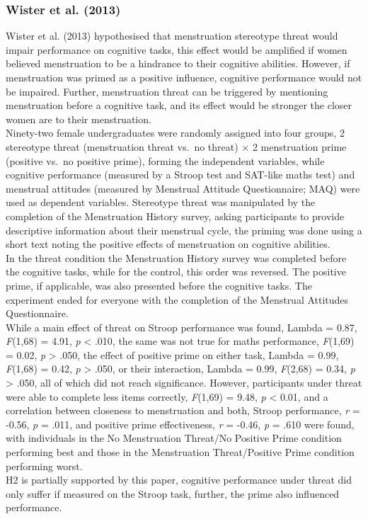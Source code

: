 \documentclass[
  stu,floatsintext]{apa7}
\begin{document}
\subsubsection{Wister et al. (2013)}\label{wistermentioningmenstruationstereotype2013}

Wister et al. (2013) hypothesised that menstruation stereotype threat would impair performance on cognitive tasks, this effect would be amplified if women believed menstruation to be a hindrance to their cognitive abilities.
However, if menstruation was primed as a positive influence, cognitive performance would not be impaired.
Further, menstruation threat can be triggered by mentioning menstruation before a cognitive task, and its effect would be stronger the closer women are to their menstruation.\\
Ninety-two female undergraduates were randomly assigned into four groups, 2 stereotype threat (menstruation threat vs.~no threat) \(\times\) 2 menstruation prime (positive vs.~no positive prime), forming the independent variables, while cognitive performance (measured by a Stroop test and SAT-like maths test) and menstrual attitudes (measured by Menstrual Attitude Questionnaire; MAQ) were used as dependent variables.
Stereotype threat was manipulated by the completion of the Menstruation History survey, asking participants to provide descriptive information about their menstrual cycle, the priming was done using a short text noting the positive effects of menstruation on cognitive abilities.\\
In the threat condition the Menstruation History survey was completed before the cognitive tasks, while for the control, this order was reversed.
The positive prime, if applicable, was also presented before the cognitive tasks.
The experiment ended for everyone with the completion of the Menstrual Attitudes Questionnaire.\\
While a main effect of threat on Stroop performance was found, Lambda = 0.87, \emph{F}(1,68) = 4.91, \emph{p} \textless{} .010, the same was not true for maths performance, \emph{F}(1,69) = 0.02, \emph{p} \textgreater{} .050, the effect of positive prime on either task, Lambda = 0.99, \emph{F}(1,68) = 0.42, \emph{p} \textgreater{} .050, or their interaction, Lambda = 0.99, \emph{F}(2,68) = 0.34, \emph{p} \textgreater{} .050, all of which did not reach significance.
However, participants under threat were able to complete less items correctly, \emph{F}(1,69) = 9.48, \emph{p} \textless{} 0.01, and a correlation between closeness to menstruation and both, Stroop performance, \emph{r} = -0.56, \emph{p} = .011, and positive prime effectiveness, \emph{r} = -0.46, \emph{p} = .610 were found, with individuals in the No Menstruation Threat/No Positive Prime condition performing best and those in the Menstruation Threat/Positive Prime condition performing worst.\\
H2 is partially supported by this paper, cognitive performance under threat did only suffer if measured on the Stroop task, further, the prime also influenced performance.
\end{document}
